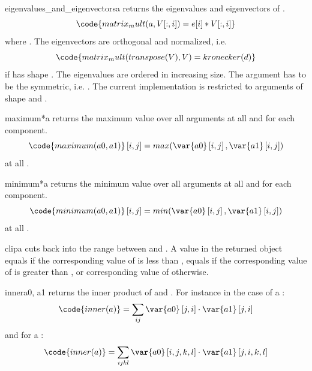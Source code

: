 \begin{funcdesc}{eigenvalues_and_eigenvectors}{a}
returns the eigenvalues and eigenvectors of .
\begin{equation}
\code{matrix_mult(a,V[:,i])=e[i]*V[:,i]}
\end{equation}
where . The eigenvectors  are
orthogonal and normalized, i.e.
\begin{equation}
\code{matrix_mult(transpose(V),V)=kronecker(d)}
\end{equation}
if  has shape . The eigenvalues are ordered in increasing
size. The argument  has to be the symmetric, i.e. .
The current implementation is restricted to arguments of shape 
and .
\end{funcdesc}

\begin{funcdesc}{maximum}{*a}
returns the maximum value over all arguments at all \DataSamplePoints and for each component.
\begin{equation}
\code{maximum(a0,a1)}\left[i,j\right]=max(\var{a0} \left[i,j\right],\var{a1} \left[i,j\right])
\end{equation}
at all \DataSamplePoints.
\end{funcdesc}

\begin{funcdesc}{minimum}{*a}
returns the minimum value over all arguments at all \DataSamplePoints and for each component.
\begin{equation}
\code{minimum(a0,a1)}\left[i,j\right]=min(\var{a0} \left[i,j\right],\var{a1} \left[i,j\right])
\end{equation}
at all \DataSamplePoints.
\end{funcdesc}

\begin{funcdesc}{clip}{a}
cuts back  into the range between  and .
A value in the returned object equals  if the corresponding value
of  is less than , equals  if the corresponding
value of  is greater than , or corresponding value of
 otherwise.
\end{funcdesc}

\begin{funcdesc}{inner}{a0, a1}
returns the inner product of  and . For instance in the
case of a \RankTwo:
\begin{equation}
\code{inner(a)}=\sum_{ij}\var{a0} \left[j,i\right]  \cdot \var{a1} \left[j,i\right]
\end{equation}
and for a \RankFour:
\begin{equation}
\code{inner(a)}=\sum_{ijkl}\var{a0} \left[i,j,k,l\right]  \cdot \var{a1} \left[j,i,k,l\right]
\end{equation}
\end{funcdesc}

